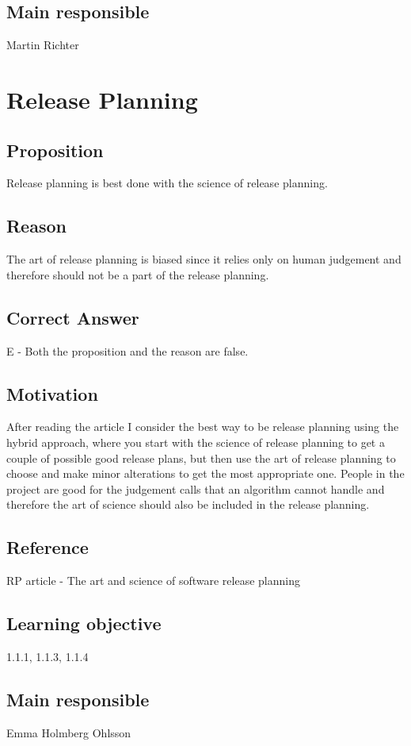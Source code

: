\documentclass[a4paper]{article}
\begin{document}
\subsection*{Main responsible}
Martin Richter



\section{Release Planning}
\subsection*{Proposition}
Release planning is best done with the science of release planning.
\subsection*{Reason}
The art of release planning is biased since it relies only on human judgement and therefore should not be a part of the release planning.
\subsection*{Correct Answer}
E - Both the proposition and the reason are false.
\subsection*{Motivation}
After reading the article I consider the best way to be release planning using the hybrid approach, where you start with the science of release planning to get a couple of possible good release plans, but then use the art of release planning to choose and make minor alterations to get the most appropriate one. People in the project are good for the judgement calls that an algorithm cannot handle and therefore the art of science should also be included in the release planning. 
\subsection*{Reference}
RP article - The art and science of software release planning
\subsection*{Learning objective}
1.1.1, 1.1.3, 1.1.4
\subsection*{Main responsible}
Emma Holmberg Ohlsson
\end{document}
